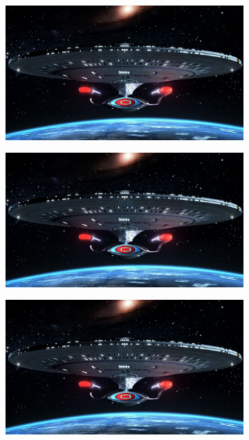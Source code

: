 \documentclass{article}
\begin{document}
\begin{figure}[h]
\begin{subfigure}{.3\textwidth}
  \centering
  \includegraphics[width=0.97\linewidth]{_Figures/sample_3.jpg}
  \caption{}
  \label{fig:raw_hist_3}
\end{subfigure}%
\begin{subfigure}{.3\textwidth}
  \centering
  \includegraphics[width=0.97\linewidth]{_Figures/sample_3_normalization_average.png}
    \caption{}
      \label{fig:average_hist_3}
\end{subfigure}
\begin{subfigure}{.3\textwidth}
  \centering
  \includegraphics[width=0.97\linewidth]{_Figures/sample_3_normalization_per_channel.png}
    \caption{}
        \label{fig:per_hist_3}
\end{subfigure}


\end{figure}
\end{document}
